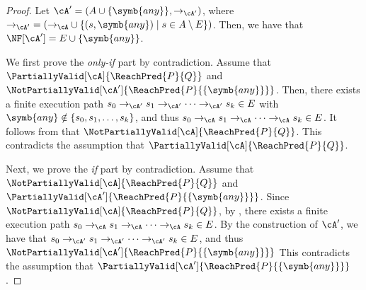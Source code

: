 \ThmSoundnessAndCompletenessOfUsingAny*
\begin{proof}
	Let $\cA'=(A\cup\{\symb{any}\}, \to_{\cA'})$, where ${\to_{\cA'}} = ({\to_\cA}\cup\{ (s,\symb{any}) \mid s \in A \setminus E \})$.
	Then, we have that $\NF[\cA']= E \cup \{\symb{any}\}$.

	We first
	prove the \textit{only-if} part by contradiction.
	Assume that $\PartiallyValid[\cA]{\ReachPred{P}{Q}}$ and
	$\NotPartiallyValid[\cA']{\ReachPred{P}{\{\symb{any}\}}}$.
	Then, there exists a finite execution path
	$s_0 \to_{\cA'} s_1 \to_{\cA'} \cdots \to_{\cA'} s_k \in E$ with
	$\symb{any} \notin \{s_0,s_1,\ldots,s_k\}$, and thus
	$s_0 \to_{\cA} s_1 \to_{\cA} \cdots \to_{\cA} s_k \in E$.
	It follows from  that $\NotPartiallyValid[\cA]{\ReachPred{P}{Q}}$.
	This contradicts the assumption that $\PartiallyValid[\cA]{\ReachPred{P}{Q}}$.

	Next, we prove the \textit{if} part by contradiction.
	Assume that $\NotPartiallyValid[\cA]{\ReachPred{P}{Q}}$ and
	$\PartiallyValid[\cA']{\ReachPred{P}{\{\symb{any}\}}}$.
	Since $\NotPartiallyValid[\cA]{\ReachPred{P}{Q}}$, by , there exists a finite execution path $s_0 \to_\cA s_1 \to_{\cA} \cdots \to_{\cA} s_k \in E$.
	By the construction of $\cA'$, we have that $s_0 \to_{\cA'} s_1 \to_{\cA'} \cdots \to_{\cA'} s_k \in E$, and thus $\NotPartiallyValid[\cA']{\ReachPred{P}{\{\symb{any}\}}}$
	This contradicts the assumption that $\PartiallyValid[\cA']{\ReachPred{P}{\{\symb{any}\}}}$.
\end{proof}

